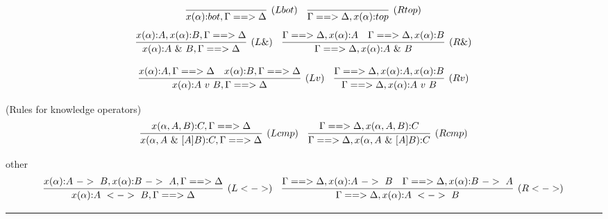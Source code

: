 \documentclass[b4paper,landscape]{article}
\begin{document}
\begin{table}[t]
\[
  \infer[(Lbot)]{
    x(\alpha){:} bot,\Gamma ==> \Delta
  }{
  }
\quad
  \infer[(Rtop)]{
    \Gamma ==> \Delta,x(\alpha){:} top
  }{
  }
\]
\[
  \infer[(L \&)]{
    x(\alpha){:} A\ \&\ B,\Gamma ==> \Delta
  }{
    x(\alpha){:} A, x(\alpha){:} B,\Gamma ==> \Delta
  }
\quad
  \infer[(R \&)]{
    \Gamma ==> \Delta,x(\alpha){:} A\ \&\ B
  }{
    \Gamma ==> \Delta,x(\alpha){:} A
    &
    \Gamma ==> \Delta,x(\alpha){:} B
  }
\]

\[
  \infer[(L v)]{
    x(\alpha){:} A\ v\ B,\Gamma ==> \Delta
  }{
    x(\alpha){:} A,\Gamma ==> \Delta
    &
    x(\alpha){:} B,\Gamma ==> \Delta
  }
\quad
  \infer[(R v)]{
    \Gamma ==> \Delta,x(\alpha){:} A\ v\ B
  }{
    \Gamma ==> \Delta,x(\alpha){:} A, x(\alpha){:} B
  }
\]

\noindent (Rules for knowledge operators)
\[
  \infer[(Lcmp)]{
    x(\alpha,A\ \&\ [A]B){:} C,\Gamma ==> \Delta
  }{
    x(\alpha,A, B){:} C,\Gamma ==> \Delta
  }
\quad
  \infer[(Rcmp)]{
    \Gamma ==> \Delta,x(\alpha,A\ \&\ [A]B){:} C
  }{
    \Gamma ==> \Delta,x(\alpha,A, B){:} C
  }
\]

other
\[
  \infer[(L<->)]{
    x(\alpha){:} A\ <->\ B,\Gamma ==> \Delta
  }{
    x(\alpha){:} A\ ->\ B,x(\alpha){:} B\ ->\ A,\Gamma ==> \Delta
  }
\quad
  \infer[(R<->)]{
    \Gamma ==> \Delta,x(\alpha){:} A\ <->\ B
  }{
    \Gamma ==> \Delta,x(\alpha){:} A\ ->\ B
    &
    \Gamma ==> \Delta,x(\alpha){:} B\ ->\ A
  }
\]
\end{table}

\hrule
\end{document}
